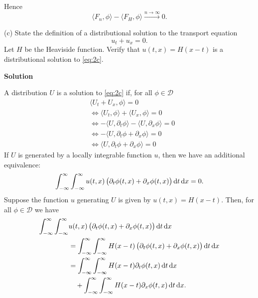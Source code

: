 \documentclass{article}
\begin{document}
%
Hence
%
\begin{equation*}
    \langle F_n, \phi \rangle - \langle F_H, \phi \rangle \xrightarrow{n \to \infty} 0
    .
\end{equation*}


\vspace{5mm}

(c) State the definition of a distributional solution to the transport
equation
%
\begin{equation}
    u_t + u_x = 0
    .
    \label{eq:2c}
\end{equation}
%
Let $H$ be the Heaviside function. Verify that $u(t, x) = H(x - t)$ is a
distributional solution to \eqref{eq:2c}.

\textbf{Solution}

A distribution $U$ is a solution to \eqref{eq:2c} if, for all
$\phi \in \mathcal{D}$
%
\begin{align*}
    &\langle U_t + U_x, \phi \rangle = 0 \\
    &\iff \langle U_t, \phi \rangle + \langle U_x, \phi \rangle = 0 \\
    &\iff - \langle U, \partial_t \phi \rangle - \langle U, \partial_x \phi \rangle = 0 \\
    &\iff - \langle U, \partial_t \phi  + \partial_x \phi \rangle = 0 \\
    &\iff \langle U, \partial_t \phi  + \partial_x \phi \rangle = 0
\end{align*}
%
If $U$ is generated by a locally integrable function $u$, then we have an
additional equivalence:
%
\begin{equation*}
    \int_{-\infty}^\infty \int_{-\infty}^\infty
        u(t, x) \del{\partial_t \phi(t, x) + \partial_x \phi(t, x)}
    \dif t \dif x
    = 0
    .
\end{equation*}
%
Suppose the function $u$ generating $U$ is given by
$u(t, x) = H(x - t)$. Then, for all $\phi \in \mathcal{D}$ we have
%
\begin{align*}
    \int_{-\infty}^\infty \int_{-\infty}^\infty&
        u(t, x) \del{\partial_t \phi(t, x) + \partial_x \phi(t, x)}
    \dif t \dif x \\
        &= \int_{-\infty}^\infty \int_{-\infty}^\infty
            H(x - t) \del{\partial_t \phi(t, x) + \partial_x \phi(t, x)}
           \dif t \dif x \\
        &= \int_{-\infty}^\infty \int_{-\infty}^\infty H(x - t) \partial_t \phi(t, x) \dif t \dif x \\
        &\quad + \int_{-\infty}^\infty \int_{-\infty}^\infty H(x - t) \partial_x \phi(t, x) \dif t \dif x
        .
\end{align*}
\end{document}
